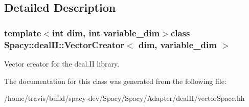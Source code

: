 \subsection{\-Detailed \-Description}
\subsubsection*{template$<$int dim, int variable\-\_\-dim$>$class Spacy\-::deal\-I\-I\-::\-Vector\-Creator$<$ dim, variable\-\_\-dim $>$}

\-Vector creator for the deal.\-I\-I library. 

\-The documentation for this class was generated from the following file\-:\begin{DoxyCompactItemize}
\item 
/home/travis/build/spacy-\/dev/\-Spacy/\-Spacy/\-Adapter/deal\-I\-I/vector\-Space.\-hh\end{DoxyCompactItemize}
